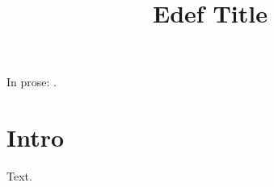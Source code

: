 \documentclass{article}
\title{Edef Title}
\begin{document}
\edef\copytitle{\@title}
\protected@edef\pcopytitle{\@title}
\begin{center}{\Large \copytitle\par}\end{center}
In prose: \pcopytitle.
\section{Intro}
Text.
\end{document}
